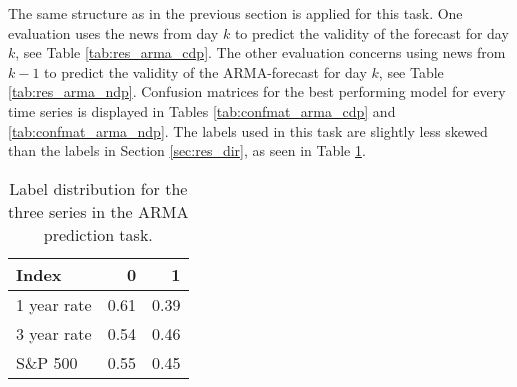 The same structure as in the previous section is applied for this task. One evaluation uses the news from day $k$ to predict the validity of the forecast for day $k$, see Table \ref{tab:res_arma_cdp}. The other evaluation concerns using news from $k-1$ to predict the validity of the ARMA-forecast for day $k$, see Table \ref{tab:res_arma_ndp}. Confusion matrices for the best performing model for every time series is displayed in Tables \ref{tab:confmat_arma_cdp} and \ref{tab:confmat_arma_ndp}.
The labels used in this task are slightly less skewed than the labels in Section \ref{sec:res_dir}, as seen in Table \ref{tab:label_dist2}.

\begin{table}[h]
    \centering
    \begin{tabular}{lrr}
       \textbf{Index}  & \textbf{0} & \textbf{1} \\
        \hline \hline 
        1 year rate & 0.61 & 0.39 \\
        3 year rate & 0.54 & 0.46 \\
        S\&P 500 & 0.55 & 0.45  \\
        \hline 
    \end{tabular}
    \caption{Label distribution for the three series in the ARMA prediction task. }
    \label{tab:label_dist2}
\end{table}


